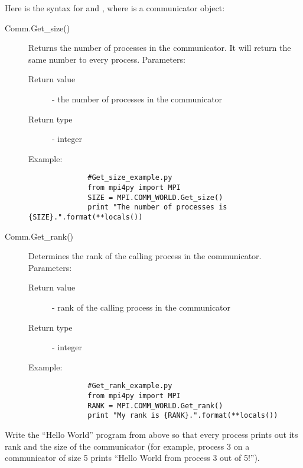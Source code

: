     Here is the syntax for  and , where  is a communicator object:

      \begin{description}
      \item[Comm.Get\_size()]
        Returns the number of processes in the communicator. It will return the same number to every process.
        Parameters:
        \begin{description}
          \item[Return value] - the number of processes in the communicator
          \item[Return type] - integer
        \end{description}
        Example:
          \begin{lstlisting}
              #Get_size_example.py
              from mpi4py import MPI
              SIZE = MPI.COMM_WORLD.Get_size()
              print "The number of processes is {SIZE}.".format(**locals())
          \end{lstlisting}
      \item[Comm.Get\_rank()]
        Determines the rank of the calling process in the communicator.
        Parameters:
        \begin{description}
          \item[Return value] - rank of the calling process in the communicator
          \item[Return type] - integer
        \end{description}
        Example:
          \begin{lstlisting}
              #Get_rank_example.py
              from mpi4py import MPI
              RANK = MPI.COMM_WORLD.Get_rank()
              print "My rank is {RANK}.".format(**locals())
          \end{lstlisting}
      \end{description}



    \begin{problem}
        Write the ``Hello World'' program from above so that every process prints out its rank and the size of the communicator (for example, process 3 on a communicator of size 5 prints ``Hello World from process 3 out of 5!'').
    \end{problem}


